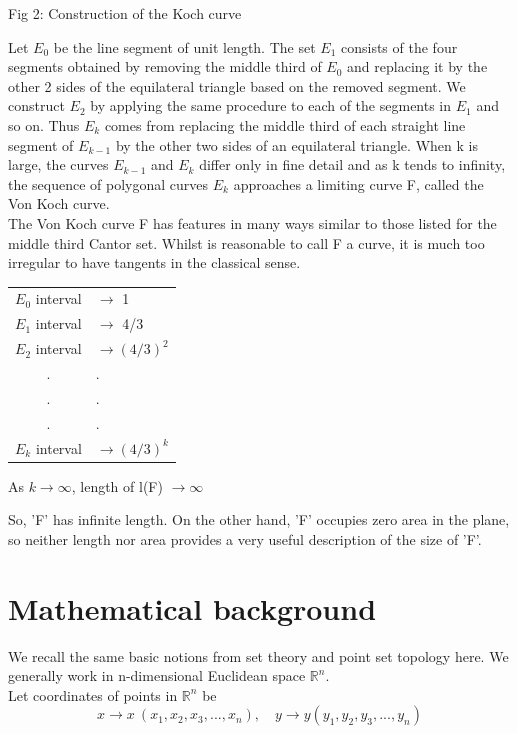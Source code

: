 \documentclass[14pt]{extarticle}
\begin{document}
\begin{enumerate}
\begin{center}
Fig 2: Construction of the Koch curve

\end{center}
Let $E_0$ be the line segment of unit length. The set $E_1$ consists of the four segments obtained by removing the middle third of $E_0$ and replacing it by the other 2 sides of the equilateral triangle based on the removed segment. We construct $E_2$ by applying the same procedure to each of the segments in $E_1$ and so on. Thus $E_k$ comes from replacing the middle third of each straight line segment of $E_{k-1}$ by the other two sides of an equilateral triangle. When k is large, the curves $E_{k-1}$ and $E_k$ differ only in fine detail and as k tends to infinity, the sequence of polygonal curves $E_k$ approaches a limiting curve F, called the Von Koch curve. \\



The Von Koch curve F has features in many ways similar to those listed for the middle third Cantor set. Whilst is reasonable to call F a curve, it is much too irregular to have tangents in the classical sense.\\

\begin{center}
\begin{tabular}{cl}
$E_0$ interval & $\rightarrow$ 1  \\
$E_1$ interval & $\rightarrow$ 4/3   \\
$E_2$ interval & $\rightarrow (4/3)^2$    \\
.&.\\
.&.\\
.&.\\
$E_k $ interval & $ \rightarrow (4/3)^k$\\
\end{tabular}

As $k\rightarrow\infty$, length of l(F) $\rightarrow\infty$
\end{center}

So, 'F' has infinite length. On the other hand, 'F' occupies zero area in the plane, so neither length nor area provides a very useful description of the size of 'F'.

\pagebreak
\section{Mathematical background}
We recall the same basic notions from set theory and point set topology here. We generally work in n-dimensional Euclidean space $\mathbb{R}^n$.\\
Let coordinates of points in $\mathbb{R}^n$ be\\
$$x \rightarrow x\ (x_1,x_2,x_3,...,x_n),\quad y \rightarrow y(y_1,y_2,y_3,...,y_n)$$\\


\end{enumerate}
\end{document}
